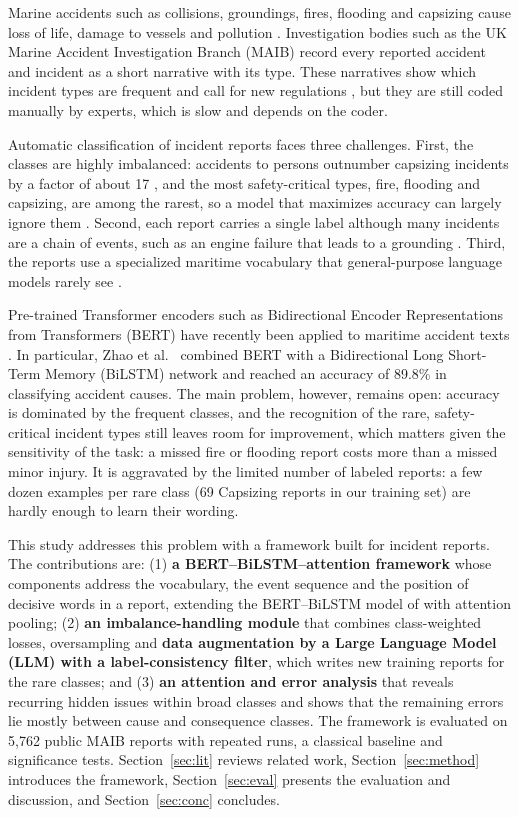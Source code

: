 \documentclass[conference]{IEEEtran}
\begin{document}
Marine accidents such as collisions, groundings, fires, flooding and capsizing cause loss of life, damage to vessels and pollution \cite{zhao2025causation}. Investigation bodies such as the UK Marine Accident Investigation Branch (MAIB) record every reported accident and incident as a short narrative with its type. These narratives show which incident types are frequent and call for new regulations \cite{black2026domain}, but they are still coded manually by experts, which is slow and depends on the coder.

Automatic classification of incident reports faces three challenges. First, the classes are highly imbalanced: accidents to persons outnumber capsizing incidents by a factor of about 17 \cite{munaev2025maib}, and the most safety-critical types, fire, flooding and capsizing, are among the rarest, so a model that maximizes accuracy can largely ignore them \cite{zhang2023longtailed}. Second, each report carries a single label although many incidents are a chain of events, such as an engine failure that leads to a grounding \cite{zhao2025causation}. Third, the reports use a specialized maritime vocabulary that general-purpose language models rarely see \cite{black2026domain}.

Pre-trained Transformer encoders such as Bidirectional Encoder Representations from Transformers (BERT) \cite{qiu2020pretrained} have recently been applied to maritime accident texts \cite{zhao2025causation,black2026domain,yu2026semantic,wang2026fire}. In particular, Zhao et al.\ \cite{zhao2025causation} combined BERT with a Bidirectional Long Short-Term Memory (BiLSTM) network and reached an accuracy of 89.8\% in classifying accident causes. The main problem, however, remains open: accuracy is dominated by the frequent classes, and the recognition of the rare, safety-critical incident types still leaves room for improvement, which matters given the sensitivity of the task: a missed fire or flooding report costs more than a missed minor injury. It is aggravated by the limited number of labeled reports: a few dozen examples per rare class (69 Capsizing reports in our training set) are hardly enough to learn their wording.

This study addresses this problem with a framework built for incident reports. The contributions are: (1) \textbf{a BERT--BiLSTM--attention framework} whose components address the vocabulary, the event sequence and the position of decisive words in a report, extending the BERT--BiLSTM model of \cite{zhao2025causation} with attention pooling; (2) \textbf{an imbalance-handling module} that combines class-weighted losses, oversampling and \textbf{data augmentation by a Large Language Model (LLM) with a label-consistency filter}, which writes new training reports for the rare classes; and (3) \textbf{an attention and error analysis} that reveals recurring hidden issues within broad classes and shows that the remaining errors lie mostly between cause and consequence classes. The framework is evaluated on 5,762 public MAIB reports with repeated runs, a classical baseline and significance tests. Section~\ref{sec:lit} reviews related work, Section~\ref{sec:method} introduces the framework, Section~\ref{sec:eval} presents the evaluation and discussion, and Section~\ref{sec:conc} concludes.
\end{document}
